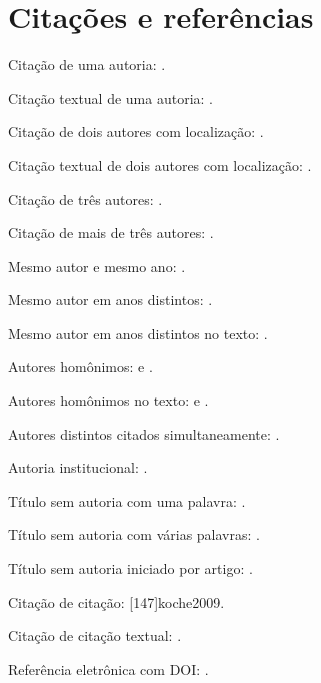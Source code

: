 \documentclass{abntexto-ufc}
\begin{document}
\tableofcontents

\section{Citações e referências}

Citação de uma autoria: \cite{silva2020}.

Citação textual de uma autoria: \textcite{silva2020}.

Citação de dois autores com localização: \cite[103]{oliveira2011}.

Citação textual de dois autores com localização: \textcite[103]{oliveira2011}.

Citação de três autores: \cite{cruz2000}.

Citação de mais de três autores: \cite[198]{rocha2021}.

Mesmo autor e mesmo ano: \cite{chiavenato2008admin,chiavenato2008gestao}.

Mesmo autor em anos distintos: \cite{rudio2002,rudio2003,rudio2007}.

Mesmo autor em anos distintos no texto: \textcite{rudio2002,rudio2003,rudio2007}.

Autores homônimos: \cite[20]{ferreiraC2007} e \cite[40]{ferreiraL2007}.

Autores homônimos no texto: \textcite[20]{ferreiraC2007} e \textcite[40]{ferreiraL2007}.

Autores distintos citados simultaneamente: \cite{silva2020,ferreira2006}.

Autoria institucional: \cite{ufc2025}.

Título sem autoria com uma palavra: \cite{acrefino1993}.

Título sem autoria com várias palavras: \cite{tribunal2011}.

Título sem autoria iniciado por artigo: \cite[5]{tunel2005}.

Citação de citação: [147]{koche2009}.

Citação de citação textual: .

Referência eletrônica com DOI: \cite{doi2025}.

\nocite{evento2025}
\ufcPrintReferences
\end{document}
